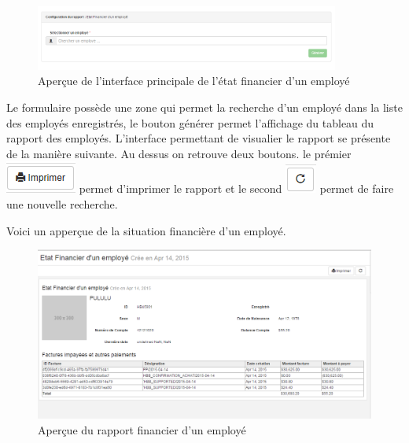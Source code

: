 \documentclass[12pt,a4paper]{report}
\begin{document}
\begin{figure}[h]
\begin{center}
\includegraphics[width=10cm]{pic/EtFinEMp.png}
\end{center}
\caption{Aperçue de l'interface principale de l'état financier d'un employé}
\label{Aperçue de l'interface principale de l'état financier d'un employé}
\end{figure}

Le formulaire possède une zone qui permet la recherche d'un employé dans la liste des employés enregistrés, le bouton générer permet l'affichage du tableau du rapport des employés. L'interface permettant de visualier le rapport se présente de la manière suivante. Au dessus on retrouve deux boutons. le prémier 
\includegraphics[scale=0.7]{pic/Print.png} permet d'imprimer le rapport et le second \includegraphics[scale=0.7]{pic/refresh.png} permet de faire une nouvelle recherche.

Voici un apperçue de la situation financière d'un employé.

\begin{figure}[h]
\begin{center}
\includegraphics[width=14cm]{pic/EtFinancierEmployer.png}
\end{center}
\caption{Aperçue du rapport financier d'un employé}
\label{Aperçue du rapport financier d'un employé}
\end{figure}
\end{document}
